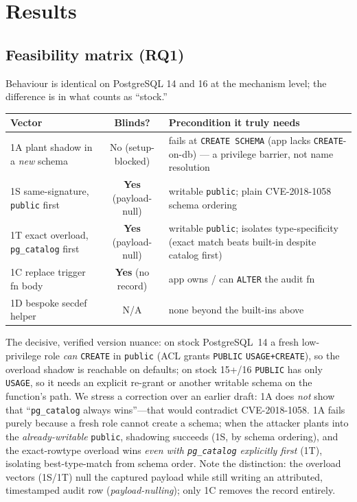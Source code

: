 \documentclass[11pt]{article}
\newcommand{\code}[1]{\texttt{#1}}
\begin{document}
\section{Results}
\subsection{Feasibility matrix (RQ1)}
Behaviour is identical on PostgreSQL 14 and 16 at the mechanism level; the difference is in
what counts as ``stock.''
\begin{table}[h]\centering\footnotesize
\begin{tabularx}{\columnwidth}{@{}l c Y@{}}
\toprule
Vector & Blinds? & Precondition it truly needs \\
\midrule
1A plant shadow in a \emph{new} schema & No (setup-blocked) & fails at \code{CREATE SCHEMA} (app lacks \code{CREATE}-on-db) --- a privilege barrier, not name resolution \\
1S same-signature, \code{public} first & \textbf{Yes} (payload-null) & writable \code{public}; plain CVE-2018-1058 schema ordering \\
1T exact overload, \code{pg\_catalog} first & \textbf{Yes} (payload-null) & writable \code{public}; isolates type-specificity (exact match beats built-in despite catalog first) \\
1C replace trigger fn body & \textbf{Yes} (no record) & app owns / can \code{ALTER} the audit fn \\
1D bespoke secdef helper & N/A & none beyond the built-ins above \\
\bottomrule
\end{tabularx}
\end{table}

The decisive, verified version nuance: on stock PostgreSQL~14 a fresh low-privilege role
\emph{can} \code{CREATE} in \code{public} (ACL grants \code{PUBLIC} \code{USAGE+CREATE}), so
the overload shadow is reachable on defaults; on stock 15+/16 \code{PUBLIC} has only
\code{USAGE}, so it needs an explicit re-grant or another writable schema on the function's
path. We stress a correction over an earlier draft: 1A does \emph{not} show that
``\code{pg\_catalog} always wins''---that would contradict CVE-2018-1058. 1A fails purely
because a fresh role cannot create a schema; when the attacker plants into the
\emph{already-writable} \code{public}, shadowing succeeds (1S, by schema ordering), and the
exact-rowtype overload wins \emph{even with \code{pg\_catalog} explicitly first} (1T),
isolating best-type-match from schema order. Note the distinction: the overload vectors
(1S/1T) null the captured payload while still writing an attributed, timestamped audit row
(\emph{payload-nulling}); only 1C removes the record entirely.
\end{document}
